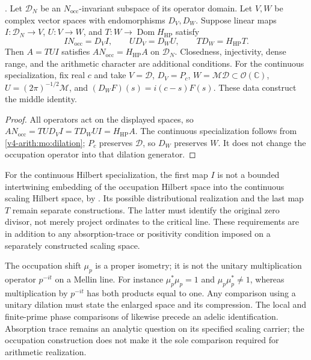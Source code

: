\begin{theorem}
\label{v4-arith:w9-r4:thm:irreducible-residual}
\ClaimStatusProvedHereConditional. Let $\mathcal D_N$ be an
$N_{\mathrm{occ}}$-invariant subspace of its operator domain.
Let $V,W$ be complex vector spaces with endomorphisms $D_V,D_W$.
Suppose linear maps $I:\mathcal D_N\to V$, $U:V\to W$, and
$T:W\to\operatorname{Dom}H_{\mathrm{HP}}$ satisfy
\[
 IN_{\mathrm{occ}}=D_VI,\qquad UD_V=D_WU,\qquad
 TD_W=H_{\mathrm{HP}}T.
\]
Then $A=TUI$ satisfies $AN_{\mathrm{occ}}=H_{\mathrm{HP}}A$ on
$\mathcal D_N$. Closedness, injectivity, dense range, and the
arithmetic character are additional conditions. For the continuous
specialization, fix real $c$ and take $V=\mathscr D$,
$D_V=P_c$, $W=\mathcal M\mathscr D\subset\mathcal O(\mathbb C)$,
$U=(2\pi)^{-1/2}\mathcal M$, and
$(D_WF)(s)=i(c-s)F(s)$. These data construct the middle identity.
\end{theorem}
\begin{proof}
All operators act on the displayed spaces, so
$AN_{\mathrm{occ}}=TUD_VI=TD_WUI=H_{\mathrm{HP}}A$.
The continuous specialization follows from
\eqref{v4-arith:mo:dilation}; $P_c$ preserves $\mathscr D$, so
$D_W$ preserves $W$. It does not change the occupation
operator into that dilation generator.
\end{proof}

For the continuous Hilbert specialization, the first map \(I\)
is not a bounded intertwining embedding of the occupation Hilbert
space into the continuous scaling Hilbert space,
by . Its
possible distributional realization and the last map \(T\) remain
separate constructions. The latter must identify the original zero
divisor, not merely project ordinates to the critical line. These
requirements are in addition to any absorption-trace or positivity
condition imposed on a separately constructed scaling space.

\begin{remark}
\label{v4-arith:w9-r4:rem:residual-at-infty}
The occupation shift \(\mu_p\) is a proper isometry; it is not the
unitary multiplication operator \(p^{-it}\) on a Mellin line.
For instance \(\mu_p^*\mu_p=1\) and
\(\mu_p\mu_p^*\ne1\), whereas multiplication by \(p^{-it}\) has both
products equal to one. Any comparison using a unitary dilation must
state the enlarged space and its compression. The local and finite-prime
phase comparisons of  likewise
precede an adelic identification. Absorption trace remains an
analytic question on its specified scaling carrier; the occupation
construction does not make it the sole comparison required for
arithmetic realization.
\end{remark}


